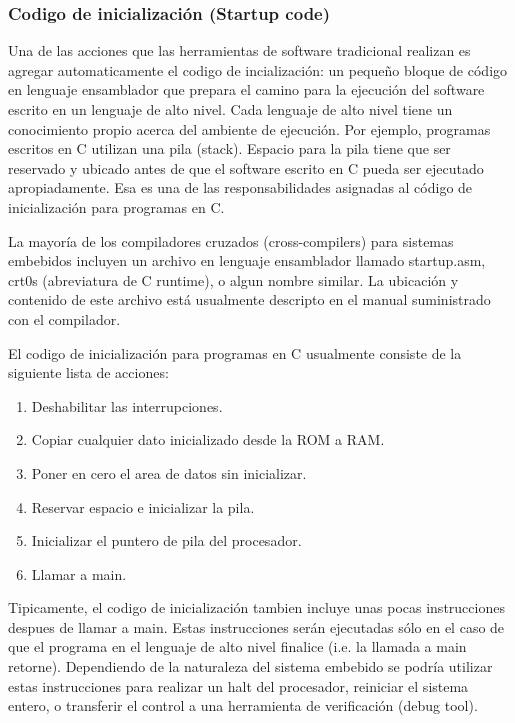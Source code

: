 \documentclass[12pt]{article}
\begin{document}
\subsubsection *{Codigo de inicialización (Startup code)}

Una de las acciones que las herramientas de software tradicional realizan
es agregar automaticamente el codigo de incialización: un pequeño bloque
de código en lenguaje ensamblador que prepara el camino para la ejecución
del software escrito en un lenguaje de alto nivel. Cada lenguaje de alto
nivel tiene un conocimiento propio acerca del ambiente de ejecución.
Por ejemplo, programas escritos en C utilizan una pila (stack). Espacio
para la pila tiene que ser reservado y ubicado antes de que el software escrito
en C pueda ser ejecutado apropiadamente. Esa es una de las responsabilidades
asignadas al código de inicialización para programas en C.

La mayoría de los compiladores cruzados (cross-compilers) para sistemas
embebidos incluyen un archivo en lenguaje ensamblador llamado startup.asm, crt0s
(abreviatura de C runtime), o algun nombre similar. La ubicación y contenido de este
archivo está usualmente descripto en el manual suministrado con el compilador.

El codigo de inicialización para programas en C usualmente consiste de la siguiente
lista de acciones:

\begin{enumerate}
\item Deshabilitar las interrupciones.
\item Copiar cualquier dato inicializado desde la ROM a RAM.
\item Poner en cero el area de datos sin inicializar.
\item Reservar espacio e inicializar la pila.
\item Inicializar el puntero de pila del procesador.
\item Llamar a main.
\end{enumerate}

Tipicamente, el codigo de inicialización tambien incluye unas pocas
instrucciones despues de llamar a main. Estas instrucciones serán ejecutadas
sólo en el caso de que el programa en el lenguaje de alto nivel finalice (i.e.
la llamada a main retorne). Dependiendo de la naturaleza del sistema embebido
se podría utilizar estas instrucciones para realizar un halt del procesador, 
reiniciar el sistema entero, o transferir el control a una herramienta
de verificación (debug tool).
\end{document}

